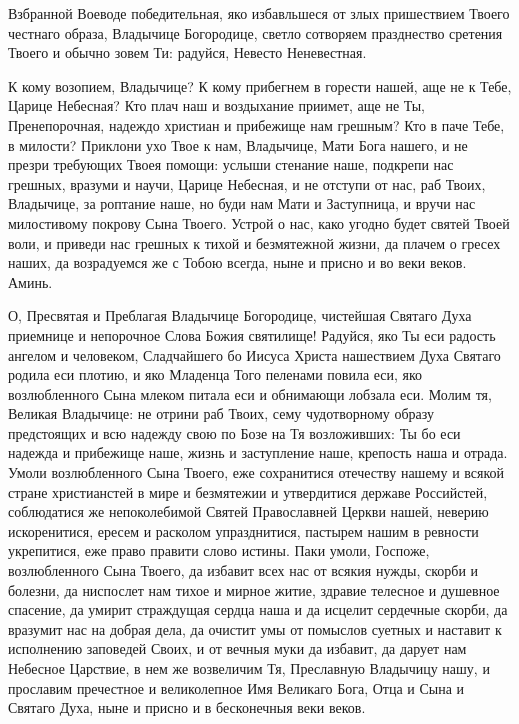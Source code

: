 

Взбранной Воеводе победительная, яко избавльшеся от злых пришествием Твоего честнаго образа, Владычице Богородице, светло сотворяем празднество сретения Твоего и обычно зовем Ти: радуйся, Невесто Неневестная.




К кому возопием, Владычице? К кому прибегнем в горести нашей, аще не к Тебе, Царице Небесная? Кто плач наш и воздыхание приимет, аще не Ты, Пренепорочная, надеждо христиан и прибежище нам грешным? Кто в паче Тебе, в милости? Приклони ухо Твое к нам, Владычице, Мати Бога нашего, и не презри требующих Твоея помощи: услыши стенание наше, подкрепи нас грешных, вразуми и научи, Царице Небесная, и не отступи от нас, раб Твоих, Владычице, за роптание наше, но буди нам Мати и Заступница, и вручи нас милостивому покрову Сына Твоего. Устрой о нас, како угодно будет святей Твоей воли, и приведи нас грешных к тихой и безмятежной жизни, да плачем о гресех наших, да возрадуемся же с Тобою всегда, ныне и присно и во веки веков. Аминь.
\mychapterending

 


О, Пресвятая и Преблагая Владычице Богородице, чистейшая Святаго Духа приемнице и непорочное Слова Божия святилище! Радуйся, яко Ты еси радость ангелом и человеком, Сладчайшего бо Иисуса Христа нашествием Духа Святаго родила еси плотию, и яко Младенца Того пеленами повила еси, яко возлюбленного Сына млеком питала еси и обнимающи лобзала еси. Молим тя, Великая Владычице: не отрини раб Твоих, сему чудотворному образу предстоящих и всю надежду свою по Бозе на Тя возложивших: Ты бо еси надежда и прибежище наше, жизнь и заступление наше, крепость наша и отрада. Умоли возлюбленного Сына Твоего, еже сохранитися отечеству нашему и всякой стране христианстей в мире и безмятежии и утвердитися державе Российстей, соблюдатися же непоколебимой Святей Православней Церкви нашей, неверию искоренитися, ересем и расколом упразднитися, пастырем нашим в ревности укрепитися, еже право правити слово истины. Паки умоли, Госпоже, возлюбленного Сына Твоего, да избавит всех нас от всякия нужды, скорби и болезни, да ниспослет нам тихое и мирное житие, здравие телесное и душевное спасение, да умирит страждущая сердца наша и да исцелит сердечные скорби, да вразумит нас на добрая дела, да очистит умы от помыслов суетных и наставит к исполнению заповедей Своих, и от вечныя муки да избавит, да дарует нам Небесное Царствие, в нем же возвеличим Тя, Преславную Владычицу нашу, и прославим пречестное и великолепное Имя Великаго Бога, Отца и Сына и Святаго Духа, ныне и присно и в бесконечныя веки веков.
\mychapterending

